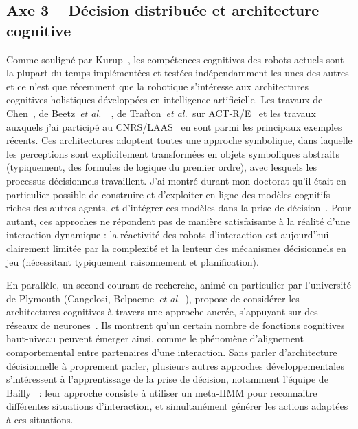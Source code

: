 \documentclass[a4paper]{article}
\newcommand{\etal}{{\textit{et al.~}}}
\begin{document}
\subsection*{Axe 3 -- Décision distribuée et architecture cognitive}

Comme souligné par Kurup~\cite{kurup2012what}, les compétences cognitives des
robots actuels sont la plupart du temps implémentées et testées indépendamment
les unes des autres et ce n'est que récemment que la robotique s'intéresse aux
architectures cognitives holistiques développées en intelligence artificielle.
Les travaux de Chen~\cite{Chen2010}, de Beetz~\etal~\cite{Beetz2010}, de
Trafton~\etal sur ACT-R/E~\cite{trafton2013act} et les travaux auxquels j'ai
participé au CNRS/LAAS~\cite{lemaignan2015human} en sont parmi les principaux
exemples récents. Ces architectures adoptent toutes une approche symbolique,
dans laquelle les perceptions sont explicitement transformées en objets
symboliques abstraits (typiquement, des formules de logique du premier ordre),
avec lesquels les processus décisionnels travaillent. J'ai montré durant mon
doctorat qu'il était en particulier possible de construire et d'exploiter en
ligne des modèles cognitifs riches des autres agents, et d'intégrer ces modèles
dans la prise de décision~\cite{alami2011when, warnier2012when,
lemaignan2015human}.  Pour autant, ces approches ne répondent pas de manière
satisfaisante à la réalité d'une interaction dynamique : la réactivité des
robots d'interaction est aujourd'hui clairement limitée par la complexité et la
lenteur des mécanismes décisionnels en jeu (nécessitant typiquement raisonnement
et planification).

En parallèle, un second courant de recherche, animé en particulier par
l'université de Plymouth (Cangelosi, Belpaeme~\etal), propose de considérer les
architectures cognitives à travers une approche
ancrée, s'appuyant sur des réseaux de neurones~\cite{morse2010epigenetic,
baxter2013cognitive}. Ils montrent qu'un certain nombre de fonctions cognitives
haut-niveau peuvent émerger ainsi, comme le phénomène d'alignement
comportemental entre partenaires d'une interaction.
Sans parler d'architecture décisionnelle à proprement parler, plusieurs autres
approches développementales s'intéressent à l'apprentissage de la prise de
décision, notamment l'équipe de Bailly~\cite{mihoub2014modeling} : leur approche
consiste à utiliser un meta-HMM pour reconnaitre différentes situations
d'interaction, et simultanément générer les actions adaptées à ces situations.
\end{document}
